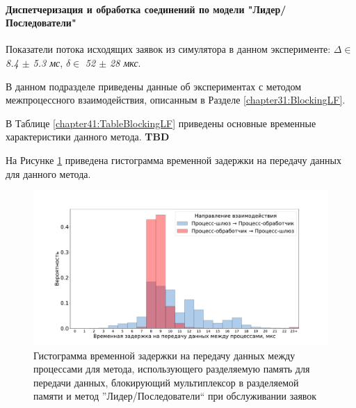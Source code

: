 \paragraph{Диспетчеризация и обработка соединений по модели "Лидер/Последователи"}

Показатели потока исходящих заявок из симулятора в данном эксперименте: $\Delta \in$ \textit{8.4 $\pm$ 5.3 мс}, $\delta \in$ \textit{52 $\pm$ 28 мкс}.

В данном подразделе приведены данные об экспериментах с методом межпроцессного взаимодействия, описанным в Разделе \ref{chapter31:BlockingLF}.

В Таблице \ref{chapter41:TableBlockingLF} приведены основные временные характеристики данного метода. \textbf{TBD}

На Рисунке \ref{chapter41:FigBlockingLF} приведена гистограмма временной задержки на передачу данных для данного метода.

\begin{figure}[!h]
\caption{Гистограмма временной задержки на передачу данных между процессами для метода, использующего разделяемую память для передачи данных, блокирующий мультиплексор в разделяемой памяти и метод ''Лидер/Последователи`` при обслуживании заявок}
\label{chapter41:FigBlockingLF}
\includegraphics[width=\textwidth]{../../graphics/hist/BlockingLF}
\end{figure}

